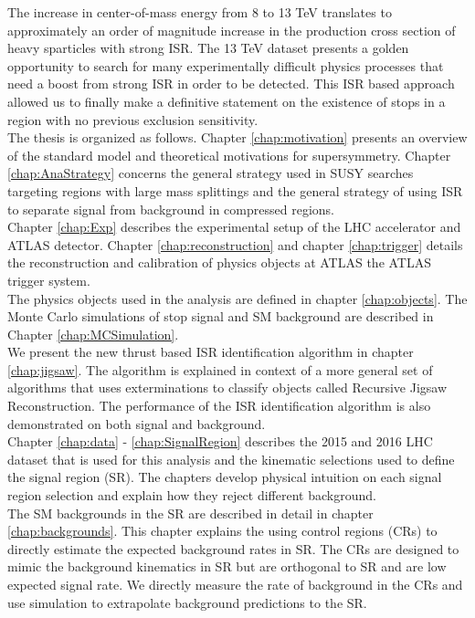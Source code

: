 \indent  The increase in center-of-mass energy from 8 to 13 TeV translates to approximately an order of magnitude increase in the production cross section of heavy sparticles with strong ISR.  The 13 TeV dataset presents a golden opportunity to search for many experimentally difficult physics processes that need a boost from strong ISR in order to be detected.  This ISR based approach allowed us to finally make a definitive statement on the existence of stops in a region with no previous exclusion sensitivity.  \\

\indent The thesis is organized as follows.  Chapter \ref{chap:motivation} presents an overview of the standard model and theoretical motivations for supersymmetry. Chapter \ref{chap:AnaStrategy} concerns the general strategy used in SUSY searches targeting regions with large mass splittings and the general strategy of using ISR to separate signal from background in compressed regions.  \\

\indent Chapter \ref{chap:Exp} describes the experimental setup of the LHC accelerator and ATLAS detector.   Chapter \ref{chap:reconstruction} and chapter \ref{chap:trigger} details the reconstruction and calibration of physics objects at ATLAS the ATLAS trigger system.  \\

\indent The physics objects used in the analysis are defined in chapter \ref{chap:objects}.  The Monte Carlo simulations of stop signal and SM background are described in Chapter \ref{chap:MCSimulation}.  \\ 

\indent We present the new thrust based ISR identification algorithm in chapter \ref{chap:jigsaw}.  The algorithm is explained in context of a more general set of algorithms that uses exterminations to classify objects called Recursive Jigsaw Reconstruction.  The performance of the ISR identification algorithm is also demonstrated on both signal and background. \\

\indent Chapter \ref{chap:data} - \ref{chap:SignalRegion} describes the 2015 and 2016 LHC dataset that is used for this analysis and the kinematic selections used to define the signal region (SR).  The chapters develop physical intuition on each signal region selection and explain how they reject different background.  \\

\indent The SM backgrounds in the SR are described in detail in chapter \ref{chap:backgrounds}.  This chapter explains the using control regions (CRs) to directly estimate the expected background rates in SR.  The CRs are designed to mimic the background kinematics in SR but are orthogonal to SR and are low expected signal rate.  We directly measure the rate of background in the CRs and use simulation to extrapolate background predictions to the SR. \\

